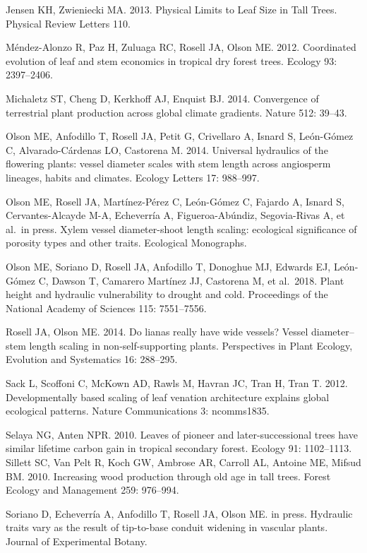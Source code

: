 \documentclass[
]{article}
\begin{document}
Jensen KH, Zwieniecki MA. 2013. Physical Limits to Leaf Size in Tall
Trees. Physical Review Letters 110.

Méndez-Alonzo R, Paz H, Zuluaga RC, Rosell JA, Olson ME. 2012.
Coordinated evolution of leaf and stem economics in tropical dry forest
trees. Ecology 93: 2397--2406.

Michaletz ST, Cheng D, Kerkhoff AJ, Enquist BJ. 2014. Convergence of
terrestrial plant production across global climate gradients. Nature
512: 39--43.

Olson ME, Anfodillo T, Rosell JA, Petit G, Crivellaro A, Isnard S,
León-Gómez C, Alvarado-Cárdenas LO, Castorena M. 2014. Universal
hydraulics of the flowering plants: vessel diameter scales with stem
length across angiosperm lineages, habits and climates. Ecology Letters
17: 988--997.

Olson ME, Rosell JA, Martínez-Pérez C, León-Gómez C, Fajardo A, Isnard
S, Cervantes-Alcayde M-A, Echeverría A, Figueroa-Abúndiz, Segovia-Rivas
A, et al.~in press. Xylem vessel diameter-shoot length scaling:
ecological significance of porosity types and other traits. Ecological
Monographs.

Olson ME, Soriano D, Rosell JA, Anfodillo T, Donoghue MJ, Edwards EJ,
León-Gómez C, Dawson T, Camarero Martínez JJ, Castorena M, et al.~2018.
Plant height and hydraulic vulnerability to drought and cold.
Proceedings of the National Academy of Sciences 115: 7551--7556.

Rosell JA, Olson ME. 2014. Do lianas really have wide vessels? Vessel
diameter--stem length scaling in non-self-supporting plants.
Perspectives in Plant Ecology, Evolution and Systematics 16: 288--295.

Sack L, Scoffoni C, McKown AD, Rawls M, Havran JC, Tran H, Tran T. 2012.
Developmentally based scaling of leaf venation architecture explains
global ecological patterns. Nature Communications 3: ncomms1835.

Selaya NG, Anten NPR. 2010. Leaves of pioneer and later-successional
trees have similar lifetime carbon gain in tropical secondary forest.
Ecology 91: 1102--1113. Sillett SC, Van Pelt R, Koch GW, Ambrose AR,
Carroll AL, Antoine ME, Mifsud BM. 2010. Increasing wood production
through old age in tall trees. Forest Ecology and Management 259:
976--994.

Soriano D, Echeverría A, Anfodillo T, Rosell JA, Olson ME. in press.
Hydraulic traits vary as the result of tip-to-base conduit widening in
vascular plants. Journal of Experimental Botany.
\end{document}
